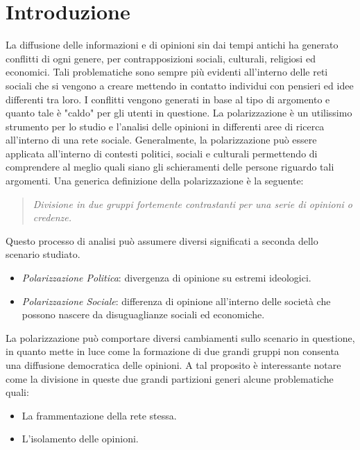 \chapter{Introduzione}
\label{Introduzione}



La diffusione delle informazioni e di opinioni sin dai tempi antichi ha generato conflitti di ogni genere, per contrapposizioni sociali, culturali, religiosi ed economici. Tali problematiche sono sempre più evidenti all'interno delle reti sociali che si vengono a creare mettendo in contatto individui con pensieri ed idee differenti tra loro. I conflitti vengono generati in base al tipo di argomento e quanto tale è "caldo" per gli utenti in questione. 
La polarizzazione è un utilissimo strumento per lo studio e l'analisi delle opinioni in differenti aree di ricerca all'interno di una rete sociale. Generalmente, la polarizzazione può essere applicata all'interno di contesti politici, sociali e culturali permettendo di comprendere al meglio quali siano  gli schieramenti delle persone riguardo tali argomenti. Una generica definizione della polarizzazione è la seguente:
\begin{quote} 
\textit{Divisione in due gruppi fortemente contrastanti per una serie di opinioni o credenze.}
\end{quote}
Questo processo di analisi può assumere diversi significati a seconda dello scenario studiato. 
\begin{itemize}
\item \textit{Polarizzazione Politica}: divergenza di opinione su estremi ideologici.
\item \textit{Polarizzazione Sociale}: differenza di opinione all'interno delle società che possono nascere da disuguaglianze sociali ed economiche.

\end{itemize}

La polarizzazione può comportare diversi cambiamenti sullo scenario in questione, in quanto mette in luce come la formazione di due grandi gruppi non consenta una diffusione democratica delle opinioni. A tal proposito è interessante notare come la divisione in queste due grandi partizioni generi alcune problematiche quali:
\begin{itemize}
\item La frammentazione della rete stessa.
\item L'isolamento delle opinioni. 
\end{itemize} 

